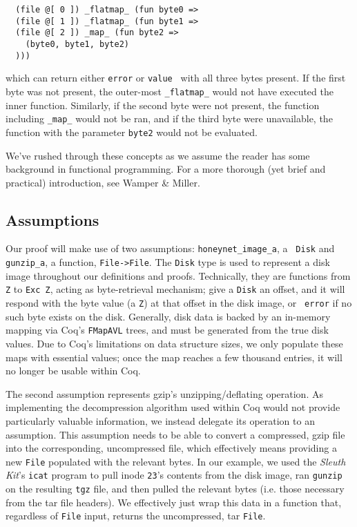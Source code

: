 \documentclass[nocopyrightspace]{sigplanconf}
\begin{document}
\begin{lstlisting}
  (file @[ 0 ]) _flatmap_ (fun byte0 =>
  (file @[ 1 ]) _flatmap_ (fun byte1 =>
  (file @[ 2 ]) _map_ (fun byte2 =>
    (byte0, byte1, byte2)
  )))
\end{lstlisting}

which can return either {\tt error} or {\tt value } with all three bytes
present. If the first byte was not present, the outer-most {\tt \_flatmap\_}
would not have executed the inner function. Similarly, if the second byte were
not present, the function including {\tt \_map\_} would not be ran, and if the
third byte were unavailable, the function with the parameter {\tt byte2} would
not be evaluated.

We've rushed through these concepts as we assume the reader has some
background in functional programming. For a more thorough (yet brief and
practical) introduction, see Wamper \& Miller\cite{scala}.

\subsection{Assumptions}
Our proof will make use of two assumptions: {\tt honeynet\_image\_a}, a {\tt
Disk} and {\tt gunzip\_a}, a function, {\tt File->File}. The {\tt Disk} type
is used to represent a disk image throughout our definitions and proofs.
Technically, they are functions from {\tt Z} to {\tt Exc Z}, acting as
byte-retrieval mechanism; give a {\tt Disk} an offset, and it will respond
with the byte value (a {\tt Z}) at that offset in the disk image, or {\tt
error} if no such byte exists on the disk. Generally, disk data is backed by
an in-memory mapping via Coq's {\tt FMapAVL} trees, and must be generated from
the true disk values. Due to Coq's limitations on data structure sizes, we
only populate these maps with essential values; once the map reaches a few
thousand entries, it will no longer be usable within Coq.

The second assumption represents gzip's unzipping/deflating operation. As
implementing the decompression algorithm used within Coq would not provide
particularly valuable information, we instead delegate its operation to an
assumption. This assumption needs to be able to convert a compressed, gzip
file into the corresponding, uncompressed file, which effectively means
providing a new {\tt File} populated with the relevant bytes. In our example,
we used the {\it Sleuth Kit}'s {\tt icat} program to pull inode {\tt 23}'s
contents from the disk image, ran {\tt gunzip} on the resulting {\tt tgz}
file, and then pulled the relevant bytes (i.e. those necessary from the tar
file headers). We effectively just wrap this data in a function that,
regardless of {\tt File} input, returns the uncompressed, tar {\tt File}.
\end{document}
